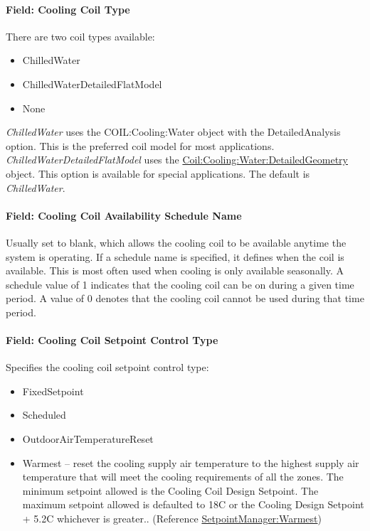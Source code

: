 \paragraph{Field: Cooling Coil Type}\label{field-cooling-coil-type-11}

There are two coil types available:

\begin{itemize}
\item
  ChilledWater
\item
  ChilledWaterDetailedFlatModel
\item
  None
\end{itemize}

\emph{ChilledWater} uses the COIL:Cooling:Water object with the DetailedAnalysis option. This is the preferred coil model for most applications. \emph{ChilledWaterDetailedFlatModel} uses the \hyperref[coilcoolingwaterdetailedgeometry]{Coil:Cooling:Water:DetailedGeometry} object. This option is available for special applications. The default is \emph{ChilledWater}.

\paragraph{Field: Cooling Coil Availability Schedule Name}\label{field-cooling-coil-availability-schedule-name-10}

Usually set to blank, which allows the cooling coil to be available anytime the system is operating. If a schedule name is specified, it defines when the coil is available. This is most often used when cooling is only available seasonally. A schedule value of 1 indicates that the cooling coil can be on during a given time period. A value of 0 denotes that the cooling coil cannot be used during that time period.

\paragraph{Field: Cooling Coil Setpoint Control Type}\label{field-cooling-coil-setpoint-control-type-1}

Specifies the cooling coil setpoint control type:

\begin{itemize}
\item
  FixedSetpoint
\item
  Scheduled
\item
  OutdoorAirTemperatureReset
\item
  Warmest -- reset the cooling supply air temperature to the highest supply air temperature that will meet the cooling requirements of all the zones. The minimum setpoint allowed is the Cooling Coil Design Setpoint. The maximum setpoint allowed is defaulted to 18C or the Cooling Design Setpoint + 5.2C whichever is greater.. (Reference \hyperref[setpointmanagerwarmest]{SetpointManager:Warmest})
\end{itemize}

